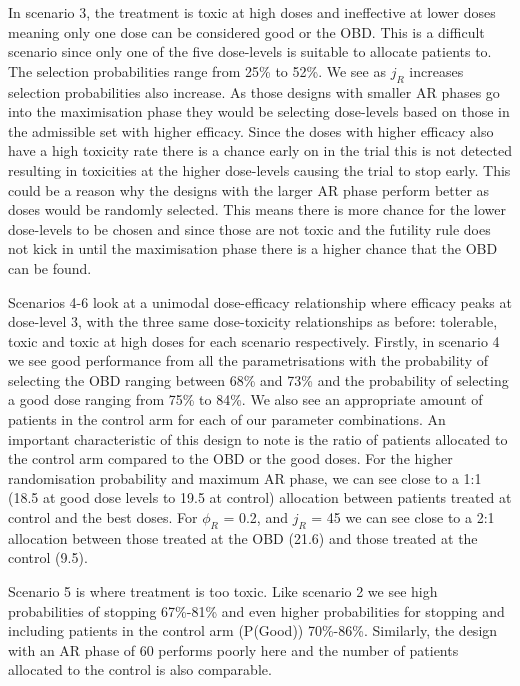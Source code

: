 In scenario 3, the treatment is toxic at high doses and ineffective at lower doses meaning only one dose can be considered good or the OBD. This is a difficult scenario since only one of the five dose-levels is suitable to allocate patients to. The selection probabilities range from 25\% to 52\%. We see as $j_R$ increases selection probabilities also increase. As those designs with smaller AR phases go into the maximisation phase they would be selecting dose-levels based on those in the admissible set with higher efficacy. Since the doses with higher efficacy also have a high toxicity rate there is a chance early on in the trial this is not detected resulting in toxicities at the higher dose-levels causing the trial to stop early. This could be a reason why the designs with the larger AR phase perform better as doses would be randomly selected. This means there is more chance for the lower dose-levels to be chosen and since those are not toxic and the futility rule does not kick in until the maximisation phase there is a higher chance that the OBD can be found.

Scenarios 4-6 look at a unimodal dose-efficacy relationship where efficacy peaks at dose-level 3, with the three same dose-toxicity relationships as before: tolerable, toxic and toxic at high doses for each scenario respectively. Firstly, in scenario 4 we see good performance from all the parametrisations with the probability of selecting the OBD ranging between 68\% and 73\% and the probability of selecting a good dose ranging from 75\% to 84\%. We also see an appropriate amount of patients in the control arm for each of our parameter combinations. An important characteristic of this design to note is the ratio of patients allocated to the control arm compared to the OBD or the good doses. For the higher randomisation probability and maximum AR phase, we can see close to a  1:1 (18.5 at good dose levels to 19.5 at control) allocation between patients treated at control and the best doses. For $\phi_R$ = 0.2, and $j_R$ = 45 we can see close to a 2:1 allocation between those treated at the OBD (21.6) and those treated at the control (9.5). 

Scenario 5 is where treatment is too toxic. Like scenario 2 we see high probabilities of stopping 67\%-81\% and even higher probabilities for stopping and including patients in the control arm (P(Good)) 70\%-86\%. Similarly, the design with an AR phase of 60 performs poorly here and the number of patients allocated to the control is also comparable. 


